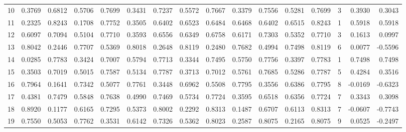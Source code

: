 \begin{tabular}{lrrrrrrrrrrrrrrr}
10 &      0.3769 &  0.6812 &  0.5706 &  0.7699 &  0.3431 &  0.7237 &  0.5572 &  0.7667 &  0.3379 &  0.7556 &   0.5281 &     0.7699 &      3 &                    0.3930 &                     0.3043 \\
11 &      0.2325 &  0.8243 &  0.1708 &  0.7752 &  0.3505 &  0.6402 &  0.6523 &  0.6484 &  0.6468 &  0.6402 &   0.6515 &     0.8243 &      1 &                    0.5918 &                     0.5918 \\
12 &      0.6097 &  0.7094 &  0.5104 &  0.7710 &  0.3593 &  0.6556 &  0.6349 &  0.6758 &  0.6171 &  0.7303 &   0.5352 &     0.7710 &      3 &                    0.1613 &                     0.0997 \\
13 &      0.8042 &  0.2446 &  0.7707 &  0.5369 &  0.8018 &  0.2648 &  0.8119 &  0.2480 &  0.7682 &  0.4994 &   0.7498 &     0.8119 &      6 &                    0.0077 &                    -0.5596 \\
14 &      0.0285 &  0.7783 &  0.3424 &  0.7007 &  0.5794 &  0.7713 &  0.3344 &  0.7495 &  0.5750 &  0.7756 &   0.3397 &     0.7783 &      1 &                    0.7498 &                     0.7498 \\
15 &      0.3503 &  0.7019 &  0.5015 &  0.7587 &  0.5134 &  0.7787 &  0.3713 &  0.7012 &  0.5761 &  0.7685 &   0.5286 &     0.7787 &      5 &                    0.4284 &                     0.3516 \\
16 &      0.7964 &  0.1641 &  0.7342 &  0.5077 &  0.7761 &  0.3448 &  0.6962 &  0.5508 &  0.7795 &  0.3556 &   0.6386 &     0.7795 &      8 &                   -0.0169 &                    -0.6323 \\
17 &      0.4381 &  0.7479 &  0.5848 &  0.7638 &  0.4990 &  0.7469 &  0.5734 &  0.7724 &  0.3595 &  0.6518 &   0.6356 &     0.7724 &      7 &                    0.3343 &                     0.3098 \\
18 &      0.8920 &  0.1177 &  0.6165 &  0.7295 &  0.5373 &  0.8002 &  0.2292 &  0.8313 &  0.1487 &  0.6707 &   0.6113 &     0.8313 &      7 &                   -0.0607 &                    -0.7743 \\
19 &      0.7550 &  0.5053 &  0.7762 &  0.3531 &  0.6142 &  0.7326 &  0.5362 &  0.8023 &  0.2587 &  0.8075 &   0.2165 &     0.8075 &      9 &                    0.0525 &                    -0.2497 \\
\bottomrule
\end{tabular}
